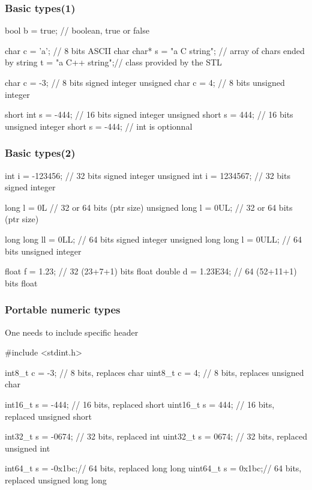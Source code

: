 \begin{frame}[fragile]
  \frametitle{Basic types(1)}
  \begin{cppcode}
    bool b = true;            // boolean, true or false
    
    char c = 'a';             // 8 bits ASCII char
    char* s = "a C string";   // array of chars ended by \0
    string t = "a C++ string";// class provided by the STL

    char c = -3;              // 8 bits signed integer
    unsigned char c = 4;      // 8 bits unsigned integer

    short int s = -444;       // 16 bits signed integer
    unsigned short s = 444;   // 16 bits unsigned integer
    short s = -444;           // int is optionnal
  \end{cppcode}
\end{frame}
\begin{frame}[fragile]
  \frametitle{Basic types(2)}
  \begin{cppcode}
    int i = -123456;          // 32 bits signed integer
    unsigned int i = 1234567; // 32 bits signed integer

    long l = 0L               // 32 or 64 bits (ptr size)
    unsigned long l = 0UL;    // 32 or 64 bits (ptr size)

    long long ll = 0LL;       // 64 bits signed integer
    unsigned long long l = 0ULL; // 64 bits unsigned integer

    float f = 1.23;           // 32 (23+7+1) bits float
    double d = 1.23E34;       // 64 (52+11+1) bits float
  \end{cppcode}
\end{frame}

\begin{frame}[fragile]
  \frametitle{Portable numeric types}
  \alert{One needs to include specific header}
  \begin{cppcode}
    #include <stdint.h>
    
    int8_t c = -3;     // 8 bits, replaces char
    uint8_t c = 4;     // 8 bits, replaces unsigned char

    int16_t s = -444;  // 16 bits, replaced short
    uint16_t s = 444;  // 16 bits, replaced unsigned short

    int32_t s = -0674; // 32 bits, replaced int
    uint32_t s = 0674; // 32 bits, replaced unsigned int

    int64_t s = -0x1bc;// 64 bits, replaced long long
    uint64_t s = 0x1bc;// 64 bits, replaced unsigned long long
    \end{cppcode}
\end{frame}

